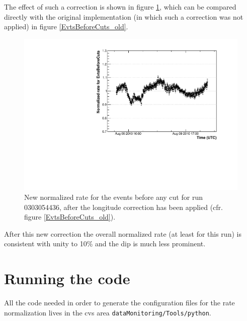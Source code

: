 \documentclass[a4paper,twocolumn]{article}
\begin{document}
The effect of such a correction is shown in figure \ref{EvtsBeforeCuts_new},
which can be compared directly with the original implementation (in which
such a correction was not applied) in figure \ref{EvtsBeforeCuts_old}.
\begin{figure}[htb!]
  \begin{center}
    \includegraphics[width=\linewidth]{figures/EvtsBeforeCuts_new}
    \caption{New normalized rate for the events before any cut for run
      0303054436, after the longitude correction has been applied (cfr.
      figure \ref{EvtsBeforeCuts_old}).}
    \label{EvtsBeforeCuts_new}
  \end{center}
\end{figure}

After this new correction the overall normalized rate (at least for this run)
is consistent with unity to 10\% and the dip is much less prominent.


\section{Running the code}

All the code needed in order to generate the configuration files for the
rate normalization lives in the cvs area \texttt{dataMonitoring/Tools/python}.
\end{document}
